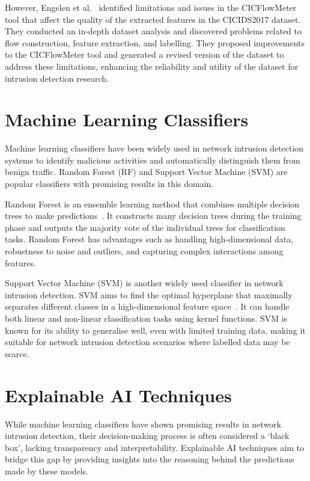 However, Engelen et al.~\cite{engelen2021troubleshooting} identified limitations and issues in the CICFlowMeter tool that affect the quality of the extracted features in the CICIDS2017 dataset. They conducted an in-depth dataset analysis and discovered problems related to flow construction, feature extraction, and labelling. They proposed improvements to the CICFlowMeter tool and generated a revised version of the dataset to address these limitations, enhancing the reliability and utility of the dataset for intrusion detection research.

\section{Machine Learning Classifiers}\label{sec:classifiers}

Machine learning classifiers have been widely used in network intrusion detection systems to identify malicious activities and automatically distinguish them from benign traffic. Random Forest (RF) and Support Vector Machine (SVM) are popular classifiers with promising results in this domain.

Random Forest is an ensemble learning method that combines multiple decision trees to make predictions~\cite{hastie2009random}. It constructs many decision trees during the training phase and outputs the majority vote of the individual trees for classification tasks. Random Forest has advantages such as handling high-dimensional data, robustness to noise and outliers, and capturing complex interactions among features.

Support Vector Machine (SVM) is another widely used classifier in network intrusion detection. SVM aims to find the optimal hyperplane that maximally separates different classes in a high-dimensional feature space~\cite{cortes1995support}. It can handle both linear and non-linear classification tasks using kernel functions. SVM is known for its ability to generalise well, even with limited training data, making it suitable for network intrusion detection scenarios where labelled data may be scarce.

\section{Explainable AI Techniques}\label{sec:explainable}

While machine learning classifiers have shown promising results in network intrusion detection, their decision-making process is often considered a `black box', lacking transparency and interpretability. Explainable AI techniques aim to bridge this gap by providing insights into the reasoning behind the predictions made by these models.

